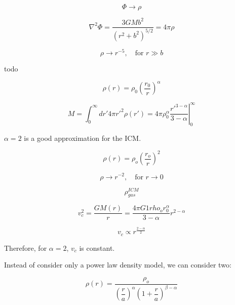 \begin{exampleblock}

    $$
    \Phi \to \rho
    $$

    $$
    \nabla^2 \Phi = \dfrac{3 G M b^2}{(r^2 + b^2)^{5/2}} = 4 \pi \rho
    $$

    $$
    \rho \to r^{-5}, \quad \text{for } r \gg b
    $$
    
\end{exampleblock}

\begin{exampleblock}
    todo
\end{exampleblock}

\begin{exampleblock}

    $$
    \rho(r) = \rho_0 \left( \dfrac{r_0}{r} \right)^\alpha
    $$

    $$
    M = \int_0^\infty dr' 4 \pi r'^2 \rho(r') = 4 \pi \rho_0^\alpha \left.\dfrac{r'^{3 - \alpha}}{3 - \alpha}\right|_0^\infty
    $$
\end{exampleblock}

\begin{exampleblock}

    $\alpha = 2$ is a good approximation for the ICM.

    $$
    \rho(r) = \rho_o \left(\dfrac{r_o}{r}\right)^2
    $$

    $$
    \rho \to r^{-2}, \quad \text{for } r \to 0
    $$

    $$
    \rho_{gas}^{ICM}
    $$

    $$
    v_c^2 = \dfrac{G M(r)}{r} = \dfrac{4\pi G 1rho_o r_0^\alpha}{3 - \alpha} r^{2-\alpha}
    $$

    $$
    v_c \propto r^{\frac{2-\alpha}{2}}
    $$

    Therefore, for $\alpha = 2$, $v_c$ is constant.
\end{exampleblock}

\begin{exampleblock}
Instead of consider only a power law density model, we can consider two:

$$
\rho (r) = \dfrac{\rho_o}{\left(\dfrac{r}{a}\right)^\alpha \left(1 + \dfrac{r}{a}\right)^{\beta - \alpha}}
$$

\end{exampleblock}

